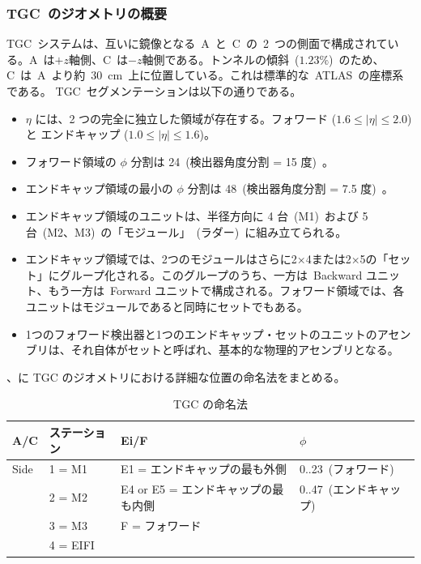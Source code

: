 \subsubsection{TGC~のジオメトリの概要}
TGC~システムは、互いに鏡像となる~A~と~C~の~2~つの側面で構成されている。A~は$+z$軸側、C~は$-z$軸側である。トンネルの傾斜~($1.23\%$)~のため、C~は~A~より約~30~cm~上に位置している。これは標準的な~ATLAS~の座標系である。
TGC~セグメンテーションは以下の通りである。
\begin{itemize}
    \item $\eta$ には、2 つの完全に独立した領域が存在する。フォワード ($1.6{\leq}|\eta|{\leq}2.0$) と エンドキャップ ($1.0{\leq}|\eta|{\leq}1.6$)。
    \item フォワード領域の $\phi$ 分割は 24~(検出器角度分割 = 15 度)~。
    \item エンドキャップ領域の最小の $\phi$ 分割は 48~(検出器角度分割 = 7.5 度)~。
    \item エンドキャップ領域のユニットは、半径方向に 4 台~(M1)~および 5 台~(M2、M3)~の「モジュール」~(ラダー)~に組み立てられる。
    \item エンドキャップ領域では、2つのモジュールはさらに2×4または2×5の「セット」にグループ化される。このグループのうち、一方は~Backward ユニット、もう一方は~Forward ユニットで構成される。フォワード領域では、各ユニットはモジュールであると同時にセットでもある。
    \item 1つのフォワード検出器と1つのエンドキャップ・セットのユニットのアセンブリは、それ自体がセットと呼ばれ、基本的な物理的アセンブリとなる。
\end{itemize}
、に TGC のジオメトリにおける詳細な位置の命名法をまとめる。

\begin{table}[tb]
	\centering
	\begin{tabular}{llll}\hline
	A/C & ステーション & Ei/F & $\phi$ \\ \hline
	Side & 1 = M1  & E1 = エンドキャップの最も外側 & 0..23~(フォワード)~\\
	& 2 = M2 & E4 or E5 = エンドキャップの最も内側 & 0..47~(エンドキャップ)~\\
	& 3 = M3 & F = フォワード & \\
	& 4 = EIFI && \\ \hline
	\end{tabular}
	\caption{TGC の命名法}
	\label{tb:tgcNaming}
\end{table}

